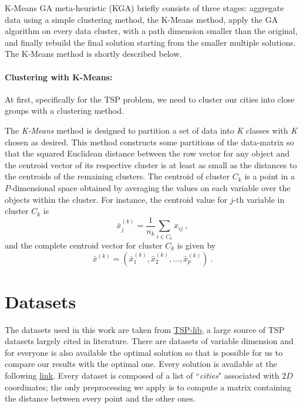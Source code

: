 \documentclass[10pt]{article}
\begin{document}
K-Means GA meta-heuristic (KGA) briefly consists of three stages: aggregate data using a simple clustering method, the K-Means method, apply the GA algorithm on every data cluster, with a path dimension smaller than the original, and finally rebuild the final solution starting from the smaller multiple solutions.
The K-Means method is shortly described below.

\paragraph{Clustering with K-Means:} 
At first, specifically for the TSP problem, we need to cluster our cities into close groups with a clustering method.

The \textit{K-Means} method is designed to partition a set of data into \textit{K} classes with \textit{K} chosen as desired.
This method constructs some partitions of the data-matrix so that the squared Euclidean distance between the row vector for any object and the centroid vector of its respective cluster is at least as small as the distances to the centroids of the remaining clusters.
The centroid of cluster $C_k$ is a point in a $P$-dimensional space obtained by averaging the values on each variable over the objects within the cluster. For instance, the centroid value for $j$-th variable in cluster $C_k$ is
\begin{equation}
\bar{x}_{j}^{(k)} = \frac{1}{n_k} \sum_{i \in C_k} x_{ij}~,
\end{equation}
and the complete centroid vector for cluster $C_k$ is given by \cite{ventidue}
\begin{equation}
\bar{x}^{(k)}  = (\bar{x}_1^{(k)},\bar{x}_2^{(k)},\dots,\bar{x}_p^{(k)})~.
\end{equation}

\section{Datasets} \label{sec:data}
The datasets used in this work are taken from  \href{https://wwwproxy.iwr.uni-heidelberg.de/groups/comopt/software/TSPLIB95/tsp/}{TSP-lib}, a large source of TSP datasets largely cited in literature. 
There are datasets of variable dimension and for everyone is also available the optimal solution so that is possible for us to compare our results with the optimal one. 
Every solution is available at the following \href{https://wwwproxy.iwr.uni-heidelberg.de/groups/comopt/software/TSPLIB95/STSP.html}{link}. 
Every dataset is composed of a list of ``\textit{cities}" associated with $2D$ coordinates; the only preprocessing we apply is to compute a matrix containing the distance between every point and the other ones.
\end{document}
